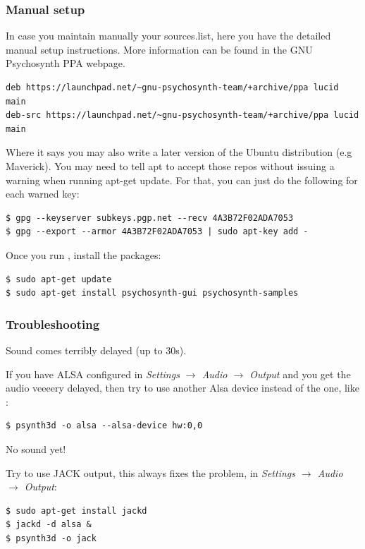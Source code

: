 \subsubsection{Manual setup}

In case you maintain manually your sources.list, here you have the
detailed manual setup instructions. More information can be found in
the GNU Psychosynth PPA webpage.
{\footnotesize
\begin{verbatim}
deb https://launchpad.net/~gnu-psychosynth-team/+archive/ppa lucid main
deb-src https://launchpad.net/~gnu-psychosynth-team/+archive/ppa lucid main
\end{verbatim}}

  Where it says  you may also write a later version of the
  Ubuntu distribution (e.g Maverick). You may need to tell apt to
  accept those repos without issuing a warning when running apt-get
  update. For that, you can just do the following for each warned key:
\begin{verbatim}
$ gpg --keyserver subkeys.pgp.net --recv 4A3B72F02ADA7053
$ gpg --export --armor 4A3B72F02ADA7053 | sudo apt-key add - 
\end{verbatim}

Once you run , install the packages:
\begin{verbatim}
$ sudo apt-get update
$ sudo apt-get install psychosynth-gui psychosynth-samples 
\end{verbatim}

\subsubsection{Troubleshooting}

\begin{troubleshoot}
Sound comes terribly delayed (up to 30s).
\end{troubleshoot}

If you have ALSA configured in \emph{Settings $\rightarrow$ Audio
  $\rightarrow$ Output} and you get the audio veeeery delayed, then
try to use another Alsa device instead of the  one, like
:
\begin{verbatim}
$ psynth3d -o alsa --alsa-device hw:0,0
\end{verbatim}

\begin{troubleshoot}
No sound yet!
\end{troubleshoot}

Try to use JACK output, this always fixes the problem, in
\emph{Settings $\rightarrow$ Audio
  $\rightarrow$ Output}:
\begin{verbatim}
$ sudo apt-get install jackd
$ jackd -d alsa &
$ psynth3d -o jack
\end{verbatim}

